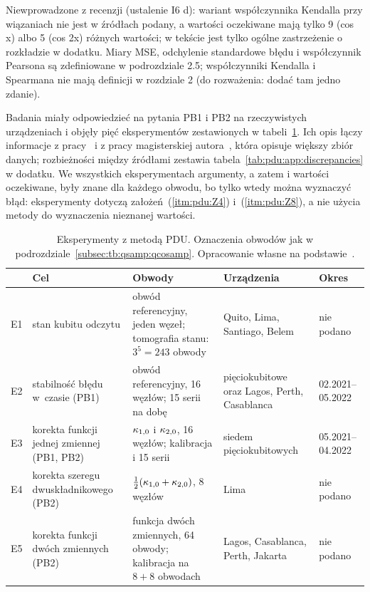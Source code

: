 {Niewprowadzone z recenzji (ustalenie I6 d): wariant współczynnika Kendalla przy wiązaniach nie jest w źródłach podany, a wartości oczekiwane mają tylko 9 (cos x) albo 5 (cos 2x) różnych wartości; w tekście jest tylko ogólne zastrzeżenie o rozkładzie w dodatku.
Miary MSE, odchylenie standardowe błędu i współczynnik Pearsona są zdefiniowane w podrozdziale 2.5; współczynniki Kendalla i Spearmana nie mają definicji w rozdziale 2 (do rozważenia: dodać tam jedno zdanie).
}

Badania miały odpowiedzieć na pytania PB1 i PB2 na rzeczywistych urządzeniach i objęły pięć eksperymentów zestawionych w tabeli~\ref{tab:pdu:protocols}.
Ich opis łączy informacje z pracy~\cite{werner_experiment_driven_2022} i z pracy magisterskiej autora~\cite{werner_magisterka_2022}, która opisuje większy zbiór danych; rozbieżności między źródłami zestawia tabela~\ref{tab:pdu:app:discrepancies} w dodatku.
We wszystkich eksperymentach argumenty, a zatem i wartości oczekiwane, były znane dla każdego obwodu, bo tylko wtedy można wyznaczyć błąd: eksperymenty dotyczą założeń~(\ref{itm:pdu:Z4}) i~(\ref{itm:pdu:Z8}), a nie użycia metody do wyznaczenia nieznanej wartości.

\begin{table}[tb]
\centering
\caption[Eksperymenty z metodą PDU]{Eksperymenty z metodą PDU.
Oznaczenia obwodów jak w podrozdziale~\ref{subsec:tb:qsamp:qcosamp}.
Opracowanie własne na podstawie~\cite{werner_experiment_driven_2022,werner_magisterka_2022}.}
\label{tab:pdu:protocols}
\footnotesize
\begin{tabular}{@{}p{0.45cm}>{\raggedright\arraybackslash}p{3.3cm}>{\raggedright\arraybackslash}p{4.5cm}>{\raggedright\arraybackslash}p{3.3cm}p{2.3cm}@{}}
\toprule
 & \textbf{Cel} & \textbf{Obwody} & \textbf{Urządzenia} & \textbf{Okres} \\
\midrule
E1 & stan kubitu odczytu & obwód referencyjny, jeden węzeł; tomografia stanu: $3^{5}=243$ obwody & Quito, Lima, Santiago, Belem & nie podano \\
E2 & stabilność błędu w~czasie (PB1) & obwód referencyjny, 16 węzłów; 15 serii na dobę & pięciokubitowe oraz Lagos, Perth, Casablanca & 02.2021--05.2022 \\
E3 & korekta funkcji jednej zmiennej (PB1, PB2) & $\kappa_{1,0}$ i $\kappa_{2,0}$, 16 węzłów; kalibracja i 15 serii & siedem pięciokubitowych & 05.2021--04.2022 \\
E4 & korekta szeregu dwuskładnikowego (PB2) & $\tfrac{1}{2}(\kappa_{1,0}+\kappa_{2,0})$, 8 węzłów & Lima & nie podano \\
E5 & korekta funkcji dwóch zmiennych (PB2) & funkcja dwóch zmiennych, 64 obwody; kalibracja na $8+8$ obwodach & Lagos, Casablanca, Perth, Jakarta & nie podano \\
\bottomrule
\end{tabular}
\end{table}

